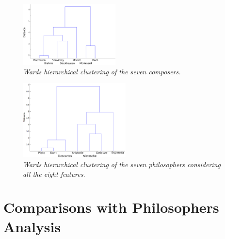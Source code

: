 \documentclass[
 aip,
 jmp,
 amsmath,amssymb,
 reprint,
]{revtex4-1}
\begin{document}
\begin{figure}[ht]
        \begin{center}
          \includegraphics[width=0.45\textwidth]{Clust_Compositores.eps}
        \end{center}
        \caption{\it Wards hierarchical clustering of the seven composers.}
        \label{fig:dendrogrammus}
\end{figure}

\begin{figure}
        \begin{center}
                \includegraphics[width=0.5\textwidth]{Dendrogram_.eps}
        \end{center}
        \caption{\it Wards  hierarchical clustering of the seven
                    philosophers considering all the eight features.}
        \label{fig:dendrogramphi}
\end{figure}

\section{Comparisons with Philosophers Analysis}
\end{document}
